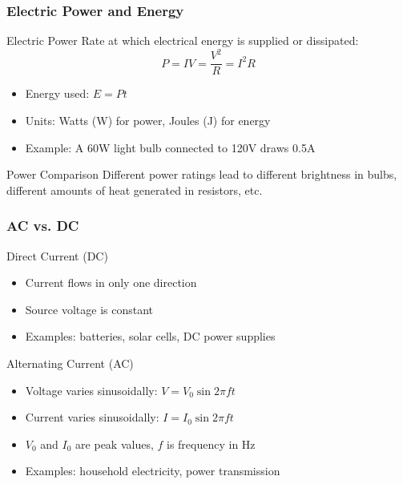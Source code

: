 \documentclass{beamer}
\begin{document}
\begin{frame}
    \frametitle{Electric Power and Energy}
    \begin{block}{Electric Power}
        Rate at which electrical energy is supplied or dissipated:
        \[ P = IV = \frac{V^2}{R} = I^2R \]
    \end{block}
    \begin{itemize}
        \item Energy used: $E = Pt$
        \item Units: Watts (W) for power, Joules (J) for energy
        \item Example: A 60W light bulb connected to 120V draws 0.5A
    \end{itemize}
    \vspace{0.5cm}
    \begin{alertblock}{Power Comparison}
        Different power ratings lead to different brightness in bulbs,
        different amounts of heat generated in resistors, etc.
    \end{alertblock}
\end{frame}

\begin{frame}
    \frametitle{AC vs. DC}
    \begin{block}{Direct Current (DC)}
        \begin{itemize}
            \item Current flows in only one direction
            \item Source voltage is constant
            \item Examples: batteries, solar cells, DC power supplies
        \end{itemize}
    \end{block}
    \begin{block}{Alternating Current (AC)}
        \begin{itemize}
            \item Voltage varies sinusoidally: $V = V_0 \sin 2\pi ft$
            \item Current varies sinusoidally: $I = I_0 \sin 2\pi ft$
            \item $V_0$ and $I_0$ are peak values, $f$ is frequency in Hz
            \item Examples: household electricity, power transmission
        \end{itemize}
    \end{block}
\end{frame}
\end{document}
